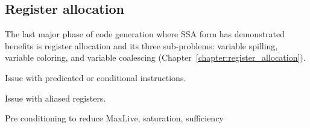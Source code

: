 \subsection{Register allocation}


The last major phase of code generation where SSA form has demonstrated benefits
is register allocation and its three sub-problems: variable spilling, variable
coloring, and variable coalescing (Chapter~\ref{chapter:register_allocation}).

Issue with predicated or conditional instructions.
\cite{Eichenberger:1995:MICRO} \cite{Johnson:1996:MICRO}

Issue with aliased registers.

Pre conditioning to reduce MaxLive, saturation, sufficiency

